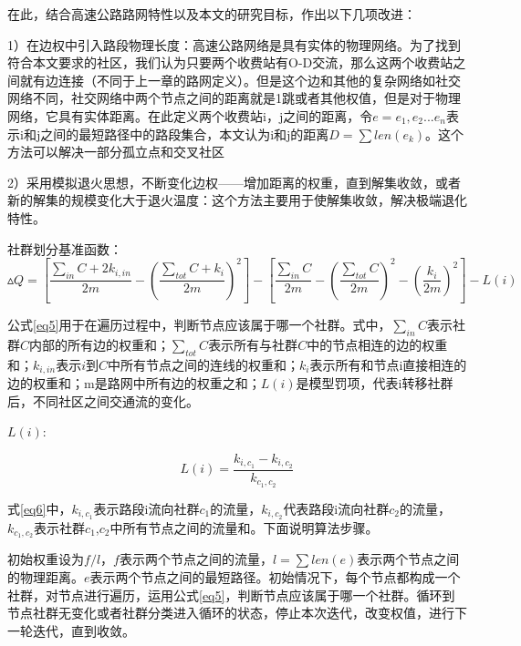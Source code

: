 			在此，结合高速公路路网特性以及本文的研究目标，作出以下几项改进：

			1）在边权中引入路段物理长度：高速公路网络是具有实体的物理网络。为了找到符合本文要求的社区，我们认为只要两个收费站有O-D交流，那么这两个收费站之间就有边连接（不同于上一章的路网定义）。但是这个边和其他的复杂网络如社交网络不同，社交网络中两个节点之间的距离就是1跳或者其他权值，但是对于物理网络，它具有实体距离。在此定义两个收费站i，j之间的距离，令$e={e_1,e_2...e_n}$表示i和j之间的最短路径中的路段集合，本文认为i和j的距离$D=\sum {len(e_k)}$。这个方法可以解决一部分孤立点和交叉社区

			2）采用模拟退火思想，不断变化边权——增加距离的权重，直到解集收敛，或者新的解集的规模变化大于退火温度：这个方法主要用于使解集收敛，解决极端退化特性。

			社群划分基准函数：
			\begin{equation}
			\vartriangle Q = [\frac{{\sum_{in} C  + 2{k_{i,in}}}}{{2m}} - {(\frac{{\sum_{tot} C  + {k_i}}}{{2m}})^2}] - [\frac{{\sum_{in} C }}{{2m}} - {(\frac{{\sum_{tot} C }}{{2m}})^2} - {(\frac{{{k_i}}}{{2m}})^2}] - L(i)
			\label{eq5}
			\end{equation}

			公式\ref{eq5}用于在遍历过程中，判断节点应该属于哪一个社群。式中，$\sum_{in} C$表示社群$C$内部的所有边的权重和；$\sum_{tot} C$表示所有与社群$C$中的节点相连的边的权重和；$k_{i,in}$表示$i$到$C$中所有节点之间的连线的权重和；$k_i$表示所有和节点i直接相连的边的权重和；m是路网中所有边的权重之和；$L(i)$是模型罚项，代表i转移社群后，不同社区之间交通流的变化。

			$L(i)$:

			\begin{equation}
			L(i)=\frac{{{k_{i,{c_1}}} - {k_{i,{c_2}}}}}{{{k_{{c_1},{c_2}}}}}
			\label{eq6}
			\end{equation}

			式\ref{eq6}中，${k_{i,{c_1}}}$表示路段i流向社群$c_1$的流量，$k_{i,{c_2}}$代表路段i流向社群$c_2$的流量，${{{k_{{c_1},{c_2}}}}}$表示社群$c_1$,$c_2$中所有节点之间的流量和。下面说明算法步骤。

			初始权重设为$f/l$，$f$表示两个节点之间的流量，$l=\sum {len(e)}$表示两个节点之间的物理距离。$e$表示两个节点之间的最短路径。初始情况下，每个节点都构成一个社群，对节点进行遍历，运用公式\ref{eq5}，判断节点应该属于哪一个社群。循环到节点社群无变化或者社群分类进入循环的状态，停止本次迭代，改变权值，进行下一轮迭代，直到收敛。

